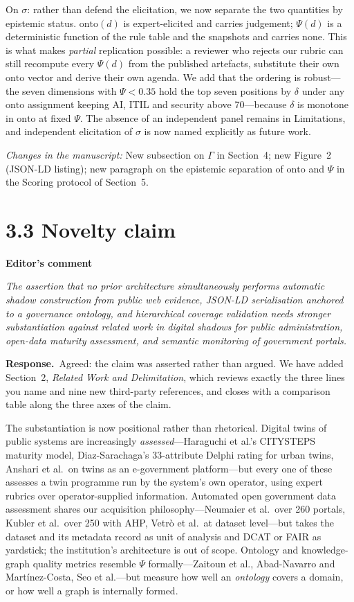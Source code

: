 \documentclass[11pt,a4paper]{article}
\newenvironment{comment}[1]
  {\par\vspace{6pt}\noindent\textbf{#1}\par\vspace{2pt}%
   \begin{mdframed}[backgroundcolor=cmtbg, linecolor=cmtrule, linewidth=0.6pt,
     innertopmargin=5pt, innerbottommargin=5pt, innerleftmargin=7pt,
     innerrightmargin=7pt, skipabove=2pt, skipbelow=5pt]\itshape}
  {\end{mdframed}}
\newcommand{\respuesta}{\par\noindent\textbf{Response.}\ }
\newcommand{\changed}[1]{\par\vspace{3pt}\noindent\textit{Changes in the manuscript:} #1\par}
\begin{document}
On $\sigma$: rather than defend the elicitation, we now separate the two quantities by epistemic status. $\mathrm{onto}(d)$ is expert-elicited and carries judgement; $\Psi(d)$ is a deterministic function of the rule table and the snapshots and carries none. This is what makes \emph{partial} replication possible: a reviewer who rejects our rubric can still recompute every $\Psi(d)$ from the published artefacts, substitute their own $\mathrm{onto}$ vector and derive their own agenda. We add that the ordering is robust---the seven dimensions with $\Psi<0.35$ hold the top seven positions by $\delta$ under any $\mathrm{onto}$ assignment keeping AI, ITIL and security above 70---because $\delta$ is monotone in $\mathrm{onto}$ at fixed $\Psi$. The absence of an independent panel remains in Limitations, and independent elicitation of $\sigma$ is now named explicitly as future work.

\changed{New subsection on $\Gamma$ in Section~4; new Figure~2 (JSON-LD listing); new paragraph on the epistemic separation of $\mathrm{onto}$ and $\Psi$ in the Scoring protocol of Section~5.}

\section*{3.3 Novelty claim}

\begin{comment}{Editor's comment}
The assertion that no prior architecture simultaneously performs automatic shadow construction from public web evidence, JSON-LD serialisation anchored to a governance ontology, and hierarchical coverage validation needs stronger substantiation against related work in digital shadows for public administration, open-data maturity assessment, and semantic monitoring of government portals.
\end{comment}

\respuesta Agreed: the claim was asserted rather than argued. We have added Section~2, \emph{Related Work and Delimitation}, which reviews exactly the three lines you name and nine new third-party references, and closes with a comparison table along the three axes of the claim.

The substantiation is now positional rather than rhetorical. Digital twins of public systems are increasingly \emph{assessed}---Haraguchi et al.'s CITYSTEPS maturity model, Diaz-Sarachaga's 33-attribute Delphi rating for urban twins, Anshari et al.\ on twins as an e-government platform---but every one of these assesses a twin programme run by the system's own operator, using expert rubrics over operator-supplied information. Automated open government data assessment shares our acquisition philosophy---Neumaier et al.\ over 260 portals, Kubler et al.\ over 250 with AHP, Vetr\`o et al.\ at dataset level---but takes the dataset and its metadata record as unit of analysis and DCAT or FAIR as yardstick; the institution's architecture is out of scope. Ontology and knowledge-graph quality metrics resemble $\Psi$ formally---Zaitoun et al., Abad-Navarro and Mart\'inez-Costa, Seo et al.---but measure how well an \emph{ontology} covers a domain, or how well a graph is internally formed.
\end{document}
